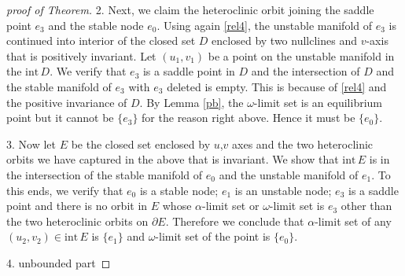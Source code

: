 \documentclass{amsart}
\def\red{\color{red}}
\theoremstyle{definition}
\numberwithin{equation}{section}
\def\ii{{\textrm{int}}\,}
\begin{document}
\begin{proof}[proof of Theorem]
2. Next, we claim the heteroclinic orbit joining the saddle point $e_3$ and the stable node $e_0$. Using again \eqref{rel4}, the unstable manifold of $e_3$ is continued into interior of the closed set $D$ enclosed by two nullclines and $v$-axis that is positively invariant. Let $(u_1,v_1)$ be a point on the unstable manifold in the $\ii D$. We verify that $e_3$ is a saddle point in $D$ and the intersection of $D$ and the stable manifold of $e_3$ with $e_3$ deleted is empty. This is because of \eqref{rel4} and the positive invariance of $D$. By Lemma \ref{pb}, the $\omega$-limit set is an equilibrium point but it cannot be $\{e_3\}$ for the reason right above. Hence it must be $\{e_0\}$.


3. Now let $E$ be the closed set enclosed by $u$,$v$ axes and the two heteroclinic orbits we have captured in the above that is invariant. We show that $\ii E$ is in the intersection of the stable manifold of $e_0$ and the unstable manifold of $e_1$. To this ends, we verify that $e_0$ is a stable node; $e_1$ is an unstable node; $e_3$ is a saddle point and there is no orbit in $E$ whose $\alpha$-limit set or $\omega$-limit set is $e_3$ other than the two heteroclinic orbits on $\partial E$. Therefore we conclude that $\alpha$-limit set of any $(u_2,v_2) \in\ii E$ is $\{e_1\}$ and $\omega$-limit set of the point is $\{e_0\}$.
% 
% 
% 

4. {\red unbounded part}


\end{proof}
\end{document}
